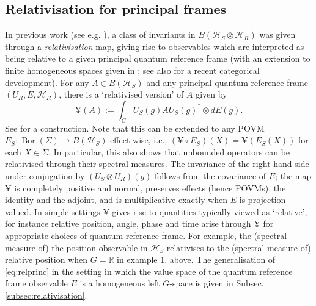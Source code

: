 \documentclass[sn-mathphys-num]{sn-jnl}%
\newcommand{\HH}{\mathcal{H}}
\DeclareMathOperator{\Bor}{Bor}
\numberwithin{equation}{section}
\theoremstyle{thmstyleone}%
\theoremstyle{thmstyletwo}%
\theoremstyle{thmstylethree}%
\begin{document}
\subsection{Relativisation for principal frames}\label{subsec:relativisation1}
In previous work (see e.g. \cite{miyadera2016approximating,Loveridge2017a,carette2023operational}), a class of invariants in $B(\mathcal{H}_S \otimes \mathcal{H}_R)$ was given through a \emph{relativisation} map, giving rise to observables which are interpreted as being relative to a given principal quantum reference frame (with an extension to finite homogeneous spaces given in \cite{glowacki2023quantum}; see also \cite{glowacki2024relativization} for a recent categorical development). For any $A \in B(\HH_S)$ and any 
principal quantum reference frame $(U_R, E, \mathcal{H}_R)$, there is a `relativised version' of $A$ given by 
\begin{equation}\label{eq:relprinc}
    \yen (A):= \int_G U_S(g)AU_S(g)^* \otimes dE(g).
    \end{equation}
See \cite{loveridge2017relativity} for a construction. Note that this can be extended to any POVM $E_S: \Bor(\Sigma)\to B(\mathcal{H}_S)$ effect-wise, i.e., $(\yen \circ E_S) (X) = \yen(E_S(X))$ for each $X \in \Sigma$. In particular, this also shows that unbounded operators can be relativised through their spectral measures.
The invariance of the right hand side under conjugation by $(U_S \otimes U_R)(g)$ follows from the covariance of $E$; the map $\yen$ is completely positive and normal, preserves effects (hence POVMs), the identity and the adjoint, and is multiplicative exactly when $E$ is projection valued. In simple settings $\yen$ gives rise to quantities typically viewed as `relative', for instance relative position, angle, phase and time arise through $\yen$ for appropriate choices of quantum reference frame. For example, the (spectral measure of) the position observable in $\mathcal{H}_S$ relativises to the (spectral measure of) relative position when $G = \mathbb{R}$ in example 1. above. The generalisation of \eqref{eq:relprinc} in the setting in which the value space of the quantum reference frame observable $E$ is a homogeneous left $G$-space is given in Subsec. \ref{subsec:relativisation}.
\end{document}
